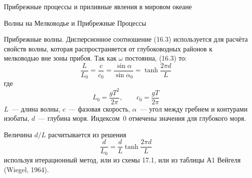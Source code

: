 \begin{chapter}{Прибрежные процессы и приливные явления в мировом океане}
\begin{section}{Волны на Мелководье и Прибрежные Процессы}
\begin{paragraph}{Прибрежные волны.}
Дисперсионное соотношение (16.3) используется для расчёта свойств
волны, которая распространяется от глубоководных районов к мелководью
вне зоны прибоя. Так как $\omega$ постоянна, (16.3) то:
\begin{equation}
\frac{L}{L_{0}} = \frac{c}{c_{0}}=\frac{\sin \alpha }{\sin \alpha _{0}} = \tanh
\frac{2 \pi d}{L} \label{eq:intermed}
\end{equation}
где
\begin{equation}
L_{0} = \frac{g T^{2}}{2 \pi }, \qquad c_{0} = \frac{g T}{2 \pi } \label{eq:Lzero}
\end{equation}
$L$~--- длина волны, $c$~--- фазовая скорость, $\alpha $~--- угол
между гребнем и контурами изобаты, $d$~--- глубина моря. Индексом~$0$
отмечены значения для глубокого моря.
%

Величина $d/L$ расчитывается из решения
\begin{equation}
\frac{d}{L_{0}} = \frac{d}{L} \tanh \frac{2 \pi d}{L} \label{eq:intermediate}
\end{equation}
используя итерационный метод, или из схемы 17.1, или из таблицы А1
Вейгеля (Wiegel, 1964).
%


\end{paragraph}
\end{section}
\end{chapter}
